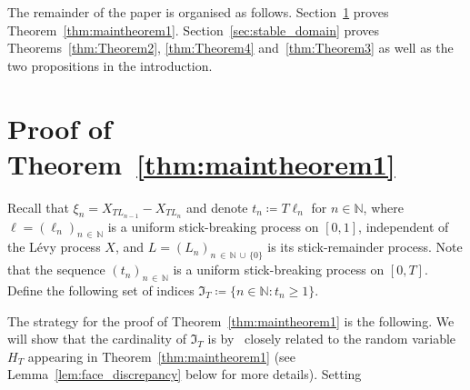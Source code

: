 \documentclass[AHL,Unicode,longabstracts,published]{cedram}
\newcommand\N{\mathbb{N}}
\newcommand\1{\mathds{1}}
\newcommand\GI{\mathfrak{I}}
\begin{document}
The remainder of the paper is organised as follows. Section~\ref{sec:Proof_Thm1} proves Theorem~\ref{thm:maintheorem1}. Section~\ref{sec:stable_domain} proves Theorems~\ref{thm:Theorem2}, \ref{thm:Theorem4} and~\ref{thm:Theorem3} as well as the two propositions in the introduction.

\section{Proof of Theorem~\ref{thm:maintheorem1}}\label{sec:Proof_Thm1}

Recall that $\xi_n= X_{TL_{n-1}}-X_{TL_n}$ and denote $t_n\coloneqq T\ell_n$ for $n\in\N$, where $\ell=(\ell_n)_{n\,\in\,\N}$ is a uniform stick-breaking process on $[0,1]$, independent of the Lévy process $X$, and $L=(L_n)_{n\,\in\,\N\,\cup\,\{0\}}$ is its stick-remainder process. Note that the sequence $(t_n)_{n\,\in\,\N}$ is a uniform stick-breaking process on $[0,T]$. Define the following set of indices $\GI_T\coloneqq \{n\in\N:t_n\ge 1\}$.

The strategy for the proof of Theorem~\ref{thm:maintheorem1} is the following. We will show that the cardinality of $\GI_T$ is by~\cite[Theorem~11]{CM_Fluctuation_Levy} closely related to the random variable $H_T$ appearing in Theorem~\ref{thm:maintheorem1} (see Lemma~\ref{lem:face_discrepancy} below for more details). Setting
\end{document}
